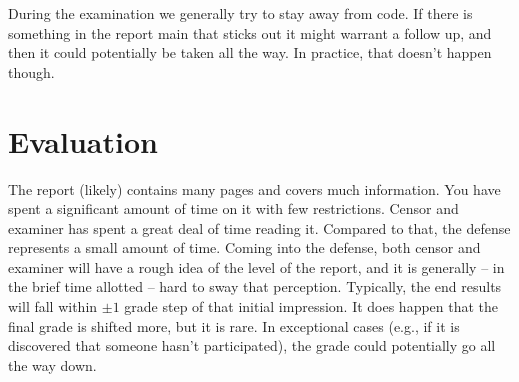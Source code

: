 \documentclass[a4paper, oneside]{memoir}
\begin{document}
During the examination we generally try to stay away from code. If there is something in the report main that sticks out it might warrant a follow up, and then it could potentially be taken all the way. In practice, that doesn't happen though.

\section{Evaluation}

The report (likely) contains many pages and covers much information. You have spent a significant amount of time on it with few restrictions. Censor and examiner has spent a great deal of time reading it. Compared to that, the defense represents a small amount of time. Coming into the defense, both censor and examiner will have a rough idea of the level of the report, and it is generally -- in the brief time allotted -- hard to sway that perception. Typically, the end results will fall within $\pm 1$ grade step of that initial impression. It does happen that the final grade is shifted more, but it is rare. In exceptional cases (e.g., if it is discovered that someone hasn't participated), the grade could potentially go all the way down.

\appendix






\printbibliography

\printindex
\end{document}
